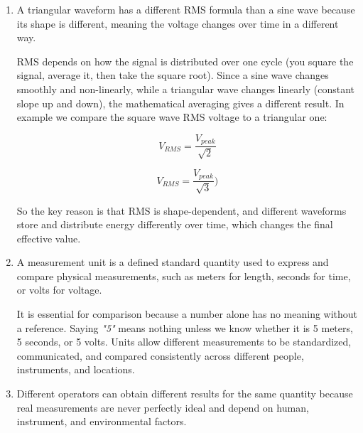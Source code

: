 \documentclass[../main.tex]{subfiles}
\begin{document}
\begin{enumerate}[label=\textbf{\arabic*.}]
	This works because a sinusoidal signal is symmetrical and smooth, so when you apply the RMS definition (squaring the signal, averaging over one full cycle, then taking the square root), it simplifies neatly to this constant factor.

	We remember that the RMS value represents the effective DC equivalent power. In this case for a sine wave, the RMS is always about 70.7\% of its peak value. This is why, for example, a mains supply labeled 230 V (RMS) actually has a peak voltage of about 325 V.

	
	\item A triangular waveform has a different RMS formula than a sine wave because its shape is different, meaning the voltage changes over time in a different way.

	RMS depends on how the signal is distributed over one cycle (you square the signal, average it, then take the square root). Since a sine wave changes smoothly and non-linearly, while a triangular wave changes linearly (constant slope up and down), the mathematical averaging gives a different result. In example we compare the square wave RMS voltage to a triangular one:
	
	\begin{equation}
		V_{RMS} = \frac{V_{peak}}{\sqrt{2}}
	\end{equation}
	
	\begin{equation}
		 V_{RMS} = \frac{V_{peak}}{\sqrt{3}} )
	\end{equation}

	So the key reason is that RMS is shape-dependent, and different waveforms store and distribute energy differently over time, which changes the final effective value.

	 
	\item A measurement unit is a defined standard quantity used to express and compare physical measurements, such as meters for length, seconds for time, or volts for voltage.

	It is essential for comparison because a number alone has no meaning without a reference. Saying \textit{"5"} means nothing unless we know whether it is 5 meters, 5 seconds, or 5 volts. Units allow different measurements to be standardized, communicated, and compared consistently across different people, instruments, and locations.


	\item Different operators can obtain different results for the same quantity because real measurements are never perfectly ideal and depend on human, instrument, and environmental factors.


\end{enumerate}
\end{document}
